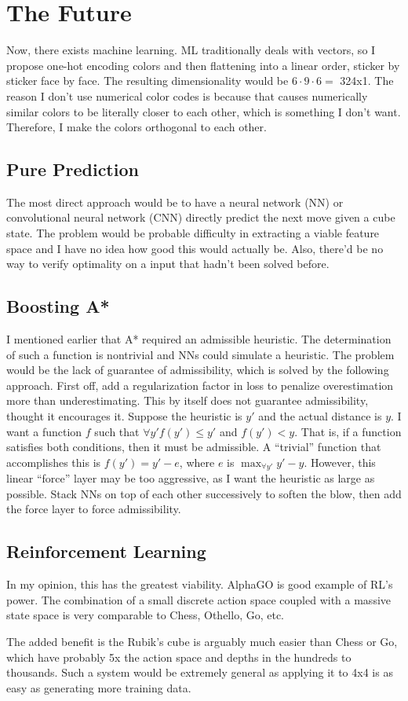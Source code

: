 \documentclass[11pt, oneside]{article}
\begin{document}
\section{The Future}
Now, there exists machine learning. ML traditionally deals with vectors, so
I propose one-hot encoding colors and then flattening into a linear order,
sticker by sticker face by face. The resulting dimensionality would be \(
6 \cdot 9 \cdot 6 = \) 324x1. The reason I don't use numerical color codes
is because that causes numerically similar colors to be literally closer to
each other, which is something I don't want. Therefore, I make the colors
orthogonal to each other.

\subsection{Pure Prediction}
The most direct approach would be to have a neural network (NN) or
convolutional neural network (CNN) directly predict the next move given a
cube state. The problem would be probable difficulty in extracting a viable
feature space and I have no idea how good this would actually be. Also, there'd
be no way to verify optimality on a input that hadn't been solved before.

\subsection{Boosting A*}
I mentioned earlier that A* required an admissible heuristic. The determination
of such a function is nontrivial and NNs could simulate a heuristic. The
problem would be the lack of guarantee of admissibility, which is solved by
the following approach. First off, add a regularization factor in loss to
penalize overestimation more than underestimating. This by itself does not
guarantee admissibility, thought it encourages it. Suppose the heuristic
is \( y' \) and the actual distance is \( y \). I want a function \( f \)
such that \( \forall y' f(y') \leq y' \) and \( f(y') < y \). That is, if a
function satisfies both conditions, then it must be admissible. A ``trivial''
function that accomplishes this is \( f(y') = y' - e \), where \( e \) is
\( \max_{\forall y'} y' - y \). However, this linear ``force'' layer may be
too aggressive, as I want the heuristic as large as possible. Stack NNs on
top of each other successively to soften the blow, then add the force layer
to force admissibility.

\subsection{Reinforcement Learning}
In my opinion, this has the greatest viability. AlphaGO is good example
of RL's power. The combination of a small discrete action space coupled
with a massive state space is very comparable to Chess, Othello, Go, etc.

The added benefit is the Rubik's cube is arguably much easier than Chess
or Go, which have probably 5x the action space and depths in the hundreds
to thousands. Such a system would be extremely general as applying it to
4x4 is as easy as generating more training data.
\end{document}
